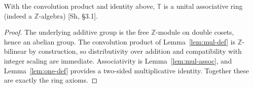 \begin{theorem}\label{thm:hecke-ring}
\leanok
With the convolution product and identity above, $\mathbb{T}$ is a unital associative ring
(indeed a $\mathbb{Z}$-algebra) [Sh, \S3.1].
\end{theorem}

\begin{proof}
\leanok
The underlying additive group is the free $\mathbb{Z}$-module on double cosets, hence an
abelian group. The convolution product of Lemma~\ref{lem:mul-def} is
$\mathbb{Z}$-bilinear by construction, so distributivity over addition and compatibility
with integer scaling are immediate. Associativity is Lemma~\ref{lem:mul-assoc}, and
Lemma~\ref{lem:one-def} provides a two-sided multiplicative identity. Together these are
exactly the ring axioms.
\end{proof}
